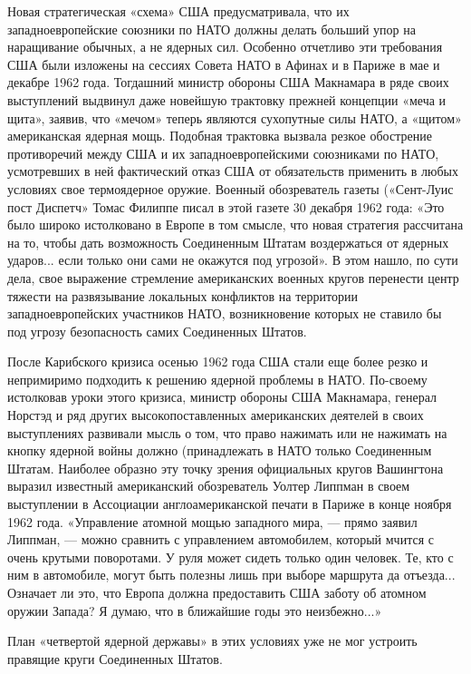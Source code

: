 \documentclass[12pt, a4paper, openany]{book}
\begin{document}
	Новая стратегическая «схема» США предусматривала, что их западноевропейские союзники по НАТО должны делать больший упор на наращивание обычных, а не ядерных сил. Особенно отчетливо эти требования США были изложены на сессиях Совета НАТО в Афинах и в Париже в мае и декабре 1962 года. Тогдашний министр обороны США Макнамара в ряде своих выступлений выдвинул даже новейшую трактовку прежней концепции «меча и щита», заявив, что «мечом» теперь являются сухопутные силы НАТО, а «щитом» американская ядерная мощь. Подобная трактовка вызвала резкое обострение противоречий между США и их западноевропейскими союзниками по НАТО, усмотревших в ней фактический отказ США от обязательств применить в любых условиях свое термоядерное оружие. Военный обозреватель газеты («Сент-Луис пост Диспетч» Томас Филиппе писал в этой газете 30 декабря 1962 года: «Это было широко истолковано в Европе в том смысле, что новая стратегия рассчитана на то, чтобы дать возможность Соединенным Штатам воздержаться от ядерных ударов... если только они сами не окажутся под угрозой». В этом нашло, по сути дела, свое выражение стремление американских военных кругов перенести центр тяжести на развязывание локальных конфликтов на территории западноевропейских участников НАТО, возникновение которых не ставило бы под угрозу безопасность самих Соединенных Штатов.
	
	После Карибского кризиса осенью 1962 года США стали еще более резко и непримиримо подходить к решению ядерной проблемы в НАТО. По-своему истолковав уроки этого кризиса, министр обороны США Макнамара, генерал Норстэд и ряд других высокопоставленных американских деятелей в своих выступлениях развивали мысль о том, что право нажимать или не нажимать на кнопку ядерной войны должно (принадлежать в НАТО только Соединенным Штатам. Наиболее образно эту точку зрения официальных кругов Вашингтона выразил известный американский обозреватель Уолтер Липпман в своем выступлении в Ассоциации англоамериканской печати в Париже в конце ноября 1962 года. «Управление атомной мощью западного мира, — прямо заявил Липпман, — можно сравнить с управлением автомобилем, который мчится с очень крутыми поворотами. У руля может сидеть только один человек. Те, кто с ним в автомобиле, могут быть полезны лишь при выборе маршрута да отъезда... Означает ли это, что Европа должна предоставить США заботу об атомном оружии Запада? Я думаю, что в ближайшие годы это неизбежно...»
	
	
	План «четвертой ядерной державы» в этих условиях уже не мог устроить правящие круги Соединенных Штатов.
	
\end{document}
